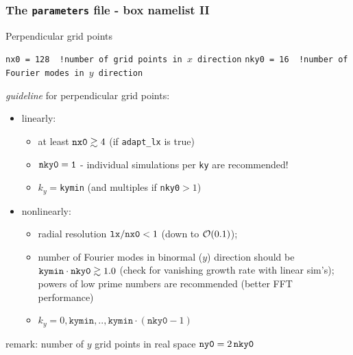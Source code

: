 \documentclass[9pt]{beamer}
\begin{document}
\begin{frame}[fragile]
  \frametitle{The {\tt parameters} file - box namelist II}
\begin{block}{Perpendicular grid points}

\begin{block}

\verb|nx0 = 128  !number of grid points in |$x$\verb| direction|
\verb|nky0 = 16  !number of Fourier modes in |$y$\verb| direction|
\end{block}
{\em guideline} for perpendicular grid points:
\begin{itemize}
\item linearly:
\begin{itemize}
\item at least ${\tt nx0}\gtrsim 4$ (if {\tt adapt\_lx} is true)
\item ${\tt nky0 = 1}$ - individual simulations per {\tt ky} are recommended!
\item $k_y = ${\tt kymin} (and multiples if {\tt nky0}$>1$)
\end{itemize}
\item nonlinearly:
\begin{itemize}
\item radial resolution ${\tt lx}/{\tt nx0} < 1$ (down to ${\cal O}(0.1)$);
\item number of Fourier modes in binormal ($y$) direction should be
${\tt kymin}\cdot {\tt nky0}\gtrsim 1.0$ (check for vanishing growth rate with linear sim's);\\
powers of low prime numbers are recommended (better FFT performance)
\item $k_y=0,\texttt{kymin},..,\texttt{kymin}\cdot\left(\texttt{nky0}-1\right)$
\end{itemize}
\end{itemize}
remark: number of $y$ grid points in real space ${\tt ny0}=2\,{\tt nky0}$
\end{block}


\end{frame}

\end{document}

